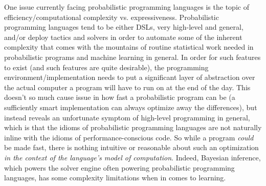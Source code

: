 \documentclass[a4paper,12pt]{article}
\begin{document}
One issue currently facing probabilistic programming languages is the topic of efficiency/computational complexity vs. expressiveness. Probabilistic programming languages tend to be either DSLs, very high-level and general, and/or deploy tactics and solvers in order to automate some of the inherent complexity that comes with the mountains of routine statistical work needed in probabilistic programs and machine learning in general. In order for such features to exist (and such features are quite desirable), the programming environment/implementation needs to put a significant layer of abstraction over the actual computer a program will have to run on at the end of the day. This doesn't so much cause issue in how fast a probabilistic program can be (a sufficiently smart implementation can always optimize away the differences), but instead reveals an unfortunate symptom of high-level programming in general, which is that the idioms of probabilistic programming languages are not naturally inline with the idioms of performance-conscious code. So while a program \emph{could} be made fast, there is nothing intuitive or reasonable about such an optimization \emph{in the context of the language's model of computation}. Indeed, Bayesian inference, which powers the solver engine often powering probabilistic programming languages, has some complexity limitations when in comes to learning.\cite{FriedmanG96}



\end{document}
